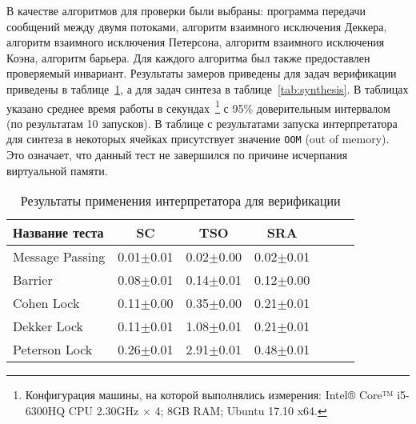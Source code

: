 В качестве алгоритмов для проверки были выбраны:
программа передачи сообщений между двумя потоками,
алгоритм взаимного исключения Деккера, 
алгоритм взаимного исключения Петерсона, 
алгоритм взаимного исключения Коэна, 
алгоритм барьера.
Для каждого алгоритма был также предоставлен проверяемый инвариант.
Результаты замеров приведены для задач верификации приведены в таблице~\ref{tab:verification},
а для задач синтеза в таблице~\ref{tab:synthesis}.
В таблицах указано среднее время работы в секундах~\footnote{
Конфигурация машины, на которой выполнялись измерения: 
Intel® Core™ i5-6300HQ CPU 2.30GHz × 4; 8GB RAM; Ubuntu 17.10 x64.
} 
с 95\% доверительным интервалом
(по результатам 10 запусков).
В таблице с результатами запуска интерпретатора для синтеза в некоторых 
ячейках присутствует значение \texttt{OOM} (out of memory).
Это означает, что данный тест не завершился по причине 
исчерпания виртуальной памяти.

\begin{table}
\bgroup
\def\arraystretch{2}
\begin{center}
\begin{tabular}{| l | c | c | c | c | c | c |}
  \hline
  Название теста & SC & TSO & SRA                                                       \\ \hline
  Message Passing                       & 0.01$\pm$0.01 & 0.02$\pm$0.00 & 0.02$\pm$0.01       \\ \hline
  Barrier                               & 0.08$\pm$0.01 & 0.14$\pm$0.01 & 0.12$\pm$0.00       \\ \hline
  Cohen Lock                            & 0.11$\pm$0.00 & 0.35$\pm$0.00 & 0.21$\pm$0.01       \\ \hline
  Dekker Lock                           & 0.11$\pm$0.01 & 1.08$\pm$0.01 & 0.21$\pm$0.01       \\ \hline
  Peterson Lock                         & 0.26$\pm$0.01 & 2.91$\pm$0.01 & 0.48$\pm$0.01       \\ \hline
\end{tabular}
\end{center}
\caption{Результаты применения интерпретатора для верификации}
\label{tab:verification}
\egroup
\end{table}

